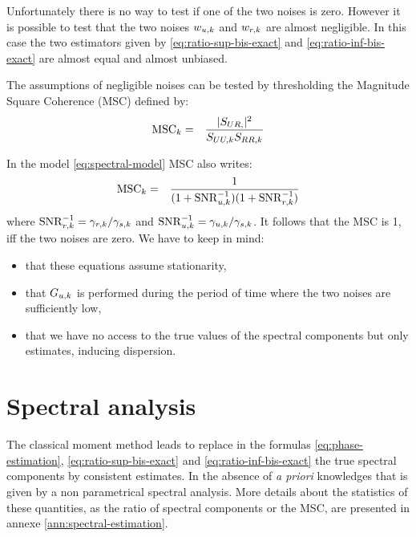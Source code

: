  Unfortunately there is no way to test if one of the two noises is zero. However it is possible to test that the two noises $w_{{u},k}$ and $w_{{r},k}$ are almost negligible. In this case the two estimators given by \eqref{eq:ratio-sup-bis-exact} and \eqref{eq:ratio-inf-bis-exact} are almost equal and almost unbiased. 

The assumptions of negligible noises can be tested by thresholding the Magnitude Square Coherence (MSC) defined by:
\begin{eqnarray}
 \label{eq:MSC-continuous-frequency}
 \mathrm{MSC}_{k} &=& \frac{|S_{UR,}|^{2}}{S_{UU,k}S_{RR,k}}
\end{eqnarray}
 
In the model \eqref{eq:spectral-model} MSC also writes:
\begin{eqnarray}
\label{eq:coherence-in-our-model}
 \mathrm{MSC}_{k} &=& \frac{1}{(1+\mathrm{SNR}^{-1}_{{u},k})(1+\mathrm{SNR}^{-1}_{{r},k})}
\end{eqnarray}
where $\mathrm{SNR}^{-1}_{{r},k}=\gamma_{{r},k}/\gamma_{s,k}$ and $\mathrm{SNR}^{-1}_{{u},k}=\gamma_{{u},k}/\gamma_{s,k}$. It follows that the MSC is 1, iff the two noises are zero. We have to keep in mind:
\begin{itemize}
\item
that these equations assume stationarity,
\item
that $G_{{u},k}$ is performed during the period of time where the two noises are sufficiently low,
\item
that we have no access to the true values of the spectral components but only estimates, inducing dispersion. 
\end{itemize}



\section{Spectral analysis}
The classical moment method leads to replace in the  formulas \eqref{eq:phase-estimation}, \eqref{eq:ratio-sup-bis-exact}  and \eqref{eq:ratio-inf-bis-exact} the true spectral components by consistent estimates. In the absence of {\it a priori} knowledges that is given by a non parametrical spectral analysis. More details about the statistics of these quantities, as  the ratio of spectral components or the MSC, are presented in annexe \ref{ann:spectral-estimation}. 


